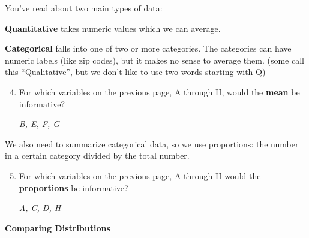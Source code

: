 You've read about two main types of data:
\begin{list}{}{}
\item [\bf Quantitative] takes numeric values which we can average.
\item [\bf Categorical] falls into one of two or more categories.  The
  categories can have numeric labels (like zip codes), but it makes no
  sense to average them. (some call this ``Qualitative'', but we don't
  like to use two words starting with Q) 
\end{list}

\begin{enumerate} 
\setcounter{enumi}{3}
\item  For which variables on the previous page, A through H, would the
  {\bf mean} be informative?
\begin{students}
    \vspace{\fill}    
\end{students}

\begin{key}
  {\it B, E, F, G }
\end{key}
\end{enumerate}

   We also need to summarize categorical data, so we use proportions:
   the number in a certain category divided by the total number.

\begin{enumerate} 
\setcounter{enumi}{4}
\item  For which variables on the previous page, A through H would the
  {\bf proportions} be informative?
\begin{students}
    \vspace*{\fill}    
\end{students}

\begin{key}
  {\it A, C, D, H }
\end{key}
     
\end{enumerate}
\begin{center}
  {\bf     Comparing Distributions} \vspace{-.2in}
\end{center}

